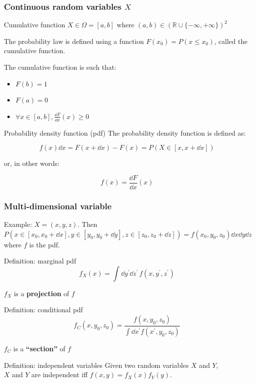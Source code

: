 \documentclass[9pt]{beamer}
\begin{document}
 \begin{frame}
 \frametitle{Continuous random variables $X$}
 
 \begin{block}{Cumulative function}
  $X \in \Omega = [a,b]$ where $(a,b) \in (\mathbb{R} \cup \{-\infty,+\infty\})^2$
  
  The probability law is defined using a function $F(x_0) = P(x \leq x_0)$, called the \alert{cumulative function}.
 \end{block}
 
 The cumulative function is such that:
 
 \begin{itemize}
  \item $F(b) = 1$
  \item $F(a) = 0$
  \item $\forall x \in [a,b], \frac{\dd F}{\dd x}(x) \geq 0$
 \end{itemize}

 \begin{block}{Probability density function (pdf)}
  The probability density function is defined as:
  
  $$f(x) \dd x = F(x+\dd x) - F(x) = P(X \in [x, x+\dd x])$$
  
  or, in other words:
  
  $$f(x) = \frac{\dd F}{\dd x}(x)$$
 \end{block}



\end{frame}

\begin{frame}
 \frametitle{Multi-dimensional variable}
 
 Example: $X = (x,y,z)$. 
 Then $P(x \in [x_0, x_0 + \dd x], y \in [y_0, y_0 + \dd y], z \in [z_0, z_0 + \dd z]) = f(x_0,y_0,z_0) \dd x \dd y \dd z$ where $f$ is the pdf.
 
 \begin{block}{Definition: marginal pdf}
  $$f_X (x) = \int \dd y^\prime \dd z^\prime\, f(x,y^\prime,z^\prime)$$
  
  $f_X$ is a \textbf{projection} of $f$
 \end{block}
 
 \begin{block}{Definition: conditional pdf}
  $$f_C (x, y_0, z_0) = \frac{f(x,y_0,z_0)}{\int \dd x^\prime f(x^\prime, y_0, z_0)}$$
  
  $f_C$ is a \textbf{``section''} of $f$
 \end{block}

 \begin{block}{Definition: independent variables}
  Given two random variables $X$ and $Y$, \\
  $X$ and $Y$ are independent iff $f(x,y) = f_X(x) f_Y(y)$.
 \end{block}


 
\end{frame}
\end{document}
